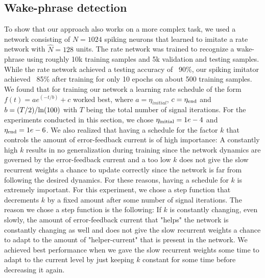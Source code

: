 \documentclass[twoside,11pt,titlepage]{article}
\begin{document}
\subsection{Wake-phrase detection}
To show that our approach also works on a more complex task, we used a network consisting of $N=1024$ spiking
neurons that learned to imitate a rate network with $\hat{N}=128$ units. The rate network was trained to recognize
a wake-phrase using roughly 10k training samples and 5k validation and testing samples. While the rate network
achieved a testing accuracy of ~90\%, our spiking imitator achieved ~85\% after training for only 10 epochs on about 500
training samples. We found that for training our network a learning rate schedule of the form $f(t)=a e^{(-t/b)}+c$
worked best, where $a=\eta_{initial}$, $c=\eta_\textnormal{end}$ and $b = (T/2) / \textnormal{ln}(100)$ with $T$ being the
total number of signal iterations. For the experiments conducted in this section, we chose $\eta_\textnormal{initial}=1e-4$ and $\eta_\textnormal{end}=1e-6$.
We also realized that having a schedule for the factor $k$ that controls the amount of error-feedback current is of high importance:
A constantly high $k$ results in no generalization during training since the network dynamics are governed by the error-feedback current and a too low
$k$ does not give the slow recurrent weights a chance to update correctly since the network is far from following the desired dynamics.
For these reasons, having a schedule for $k$ is extremely important. For this experiment, we chose a step function that decrements $k$ by a fixed amount
after some number of signal iterations. The reason we chose a step function is the following: 
If $k$ is constantly changing, even slowly, the amount of error-feedback current that "helps" the network
is constantly changing as well and does not give the slow recurrent weights a chance to adapt to the amount of "helper-current" that is
present in the network. We achieved best performance when we gave the slow recurrent weights some time to adapt to the current level by just
keeping $k$ constant for some time before decreasing it again.   
\end{document}
